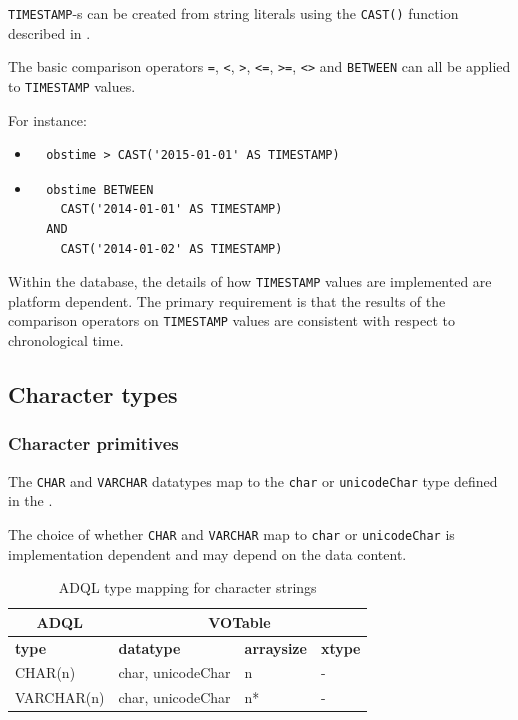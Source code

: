 \documentclass[11pt,a4paper]{ivoa}
\begin{document}
\verb:TIMESTAMP:-s can be created from string literals using the \verb:CAST():
function described in .

The basic comparison operators \verb:=:, \verb:<:, \verb:>:, \verb:<=:, \verb:>=:,
\verb:<>: and \verb:BETWEEN: can all be applied to \verb:TIMESTAMP: values.

For instance:
\begin{itemize}
    \item \begin{verbatim}
  obstime > CAST('2015-01-01' AS TIMESTAMP)
\end{verbatim}
    \item \begin{verbatim}
  obstime BETWEEN
    CAST('2014-01-01' AS TIMESTAMP)
  AND
    CAST('2014-01-02' AS TIMESTAMP)
    \end{verbatim}
\end{itemize}

Within the database, the details of how \verb:TIMESTAMP: values are implemented
are platform dependent. The primary requirement is that the results of the
comparison operators on \verb:TIMESTAMP: values are consistent with respect to
chronological time.

\subsection{Character types}
\label{sec:types.character}

\subsubsection{Character primitives}
\label{sec:types.character.primitive}

The \verb:CHAR: and \verb:VARCHAR: datatypes map to the \verb:char: or
\verb:unicodeChar: type defined in the \VOTableSpec{}.

The choice of whether \verb:CHAR: and \verb:VARCHAR: map to \verb:char: or
\verb:unicodeChar: is implementation dependent and may depend on the data
content.

\begin{table}[h]\footnotesize
    \begin{tabular}
        {|p{}|p{}|p{}|p{}|}

        \hline
        \multicolumn{1}{|c|}{\textbf{ADQL}} &
        \multicolumn{3}{|c|}{\textbf{VOTable}}
        \tabularnewline

        \hline
        \textbf{type} &
        \textbf{datatype} &
        \textbf{arraysize} &
        \textbf{xtype}
        \tabularnewline

        \hline
        CHAR(n) &
        char, unicodeChar &
        n &
        -
        \tabularnewline

        \hline
        VARCHAR(n) &
        char, unicodeChar &
        n* &
        -
        \tabularnewline
        \hline
    \end{tabular}
    \caption{ADQL type mapping for character strings}
    \label{table:types.character.primitive}
\end{table}
\end{document}
